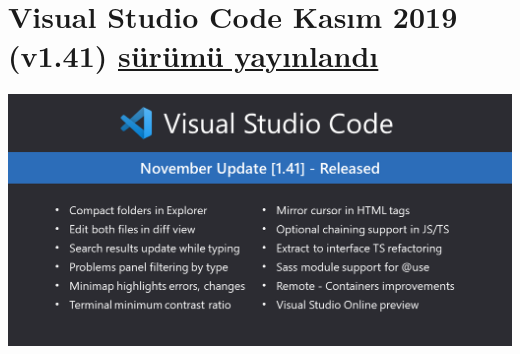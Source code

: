 \documentclass[11pt]{article}
\begin{document}
\section{Visual Studio Code Kasım 2019 (v1.41) \href{https://code.visualstudio.com/updates/v1\_41}{sürümü yayınlandı}}
\label{sec:orgdb7418e}
\begin{center}
\includegraphics[width=.9\linewidth]{gorseller/vscode-1-41.png}
\end{center}
\end{document}
